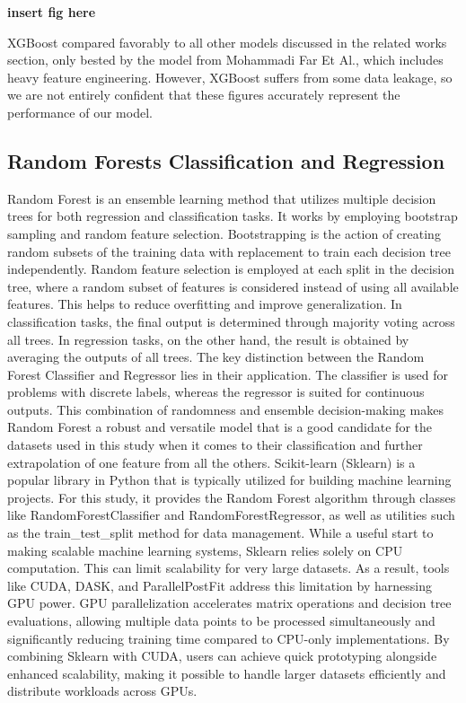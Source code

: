 \documentclass[conference]{IEEEtran}
\begin{document}
\textbf{insert fig here}

XGBoost compared favorably to all other models discussed in the related works section, only bested by the model from Mohammadi Far Et Al., which includes heavy feature engineering. However, XGBoost suffers from some data leakage, so we are not entirely confident that these figures accurately represent the performance of our model.

\subsection{Random Forests Classification and Regression}
Random Forest is an ensemble learning method that utilizes multiple decision trees for both regression and classification tasks. It works by employing bootstrap sampling and random feature selection. Bootstrapping is the action of creating random subsets of the training data with replacement to train each decision tree independently. Random feature selection is employed at each split in the decision tree, where a random subset of features is considered instead of using all available features. This helps to reduce overfitting and improve generalization. In classification tasks, the final output is determined through majority voting across all trees. In regression tasks, on the other hand, the result is obtained by averaging the outputs of all trees. The key distinction between the Random Forest Classifier and Regressor lies in their application. The classifier is used for problems with discrete labels, whereas the regressor is suited for continuous outputs. This combination of randomness and ensemble decision-making makes Random Forest a robust and versatile model that is a good candidate for the datasets used in this study when it comes to their classification and further extrapolation of one feature from all the others. 
Scikit-learn (Sklearn) is a popular library in Python that is typically utilized for building machine learning projects. For this study, it provides the Random Forest algorithm through classes like RandomForestClassifier and RandomForestRegressor, as well as utilities such as the train\_test\_split method for data management. While a useful start to making scalable machine learning systems, Sklearn relies solely on CPU computation. This can limit scalability for very large datasets. As a result, tools like CUDA, DASK, and ParallelPostFit address this limitation by harnessing GPU power. GPU parallelization accelerates matrix operations and decision tree evaluations, allowing multiple data points to be processed simultaneously and significantly reducing training time compared to CPU-only implementations. By combining Sklearn with CUDA, users can achieve quick prototyping alongside enhanced scalability, making it possible to handle larger datasets efficiently and distribute workloads across GPUs.
\end{document}
